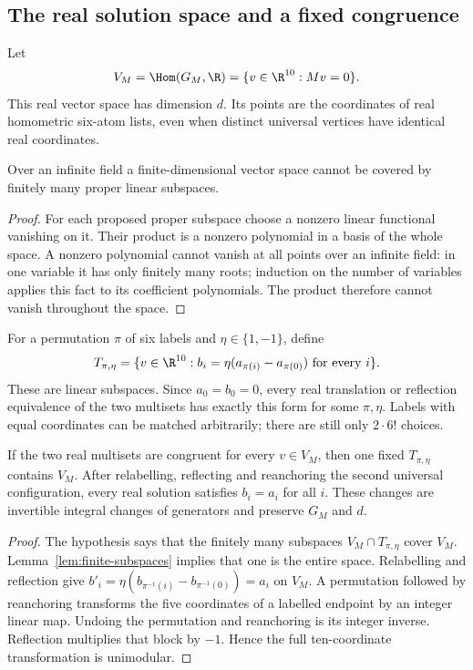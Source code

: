 \subsection{The real solution space and a fixed congruence}
Let
\[
 V_M=\Hom(G_M,\R)=\{v\in\R^{10}:Mv=0\}.
\]
This real vector space has dimension $d$. Its points are the coordinates
of real homometric six-atom lists, even when distinct universal vertices
have identical real coordinates.

\begin{lemma}\label{lem:finite-subspaces}
Over an infinite field a finite-dimensional vector space cannot be covered
by finitely many proper linear subspaces.
\end{lemma}
\begin{proof}
For each proposed proper subspace choose a nonzero linear functional
vanishing on it. Their product is a nonzero polynomial in a basis of the
whole space. A nonzero polynomial cannot vanish at all points over an
infinite field: in one variable it has only finitely many roots; induction
on the number of variables applies this fact to its coefficient
polynomials. The product therefore cannot vanish throughout the space.
\end{proof}

For a permutation $\pi$ of six labels and $\eta\in\{1,-1\}$, define
\[
 T_{\pi,\eta}=\{v\in\R^{10}:
  b_i=\eta(a_{\pi(i)}-a_{\pi(0)})\text{ for every }i\}.
\]
These are linear subspaces. Since $a_0=b_0=0$, every real translation or
reflection equivalence of the two multisets has exactly this form for
some $\pi,\eta$. Labels with equal coordinates can be matched arbitrarily;
there are still only $2\cdot6!$ choices.

\begin{lemma}\label{lem:fixed-alignment}
If the two real multisets are congruent for every $v\in V_M$, then one
fixed $T_{\pi,\eta}$ contains $V_M$. After relabelling, reflecting and
reanchoring the second universal configuration, every real solution
satisfies $b_i=a_i$ for all $i$. These changes are invertible integral
changes of generators and preserve $G_M$ and $d$.
\end{lemma}
\begin{proof}
The hypothesis says that the finitely many subspaces
$V_M\cap T_{\pi,\eta}$ cover $V_M$. Lemma~\ref{lem:finite-subspaces}
implies that one is the entire space. Relabelling and reflection give
$b'_i=\eta(b_{\pi^{-1}(i)}-b_{\pi^{-1}(0)})=a_i$ on $V_M$.
A permutation followed by reanchoring transforms the five coordinates
of a labelled endpoint by an integer linear map. Undoing the permutation
and reanchoring is its integer inverse. Reflection multiplies that block
by $-1$. Hence the full ten-coordinate transformation is unimodular.
\end{proof}

